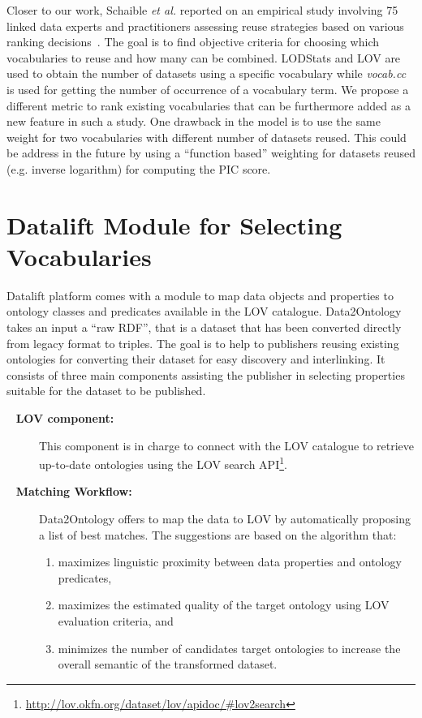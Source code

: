 \begin{description}
Closer to our work, Schaible \emph{et al.} reported on an empirical study involving 75 linked data experts and practitioners assessing reuse strategies based on various ranking decisions~\cite{Schaible:ESWC14}. The goal is to find objective criteria for choosing which vocabularies to reuse and how many can be combined. LODStats and LOV are used to obtain the number of datasets using a specific vocabulary while \textit{vocab.cc} is used for getting the number of occurrence of a vocabulary term. We propose a different metric to rank existing vocabularies that can be furthermore added as a new feature in such a study. One drawback in the model is to use the same weight for two vocabularies with different number of datasets reused. This could be address in the future by using a ``function based'' weighting for datasets reused (e.g. inverse logarithm) for computing the PIC score.



\section{Datalift Module for Selecting Vocabularies}
\label{sec:data2rdf}
Datalift platform comes with a module to map data objects and properties to ontology classes and predicates available in the LOV catalogue. Data2Ontology takes an input a ``raw RDF'', that is a dataset that has been converted directly from legacy format to triples. The goal is to help to publishers reusing existing ontologies for converting their dataset for easy discovery and interlinking. It consists of three main components assisting the publisher in selecting properties suitable for the dataset to be published. \begin{description}
\item[\odot~ \textbf{LOV component:}] This component is in charge to connect with the LOV catalogue to retrieve up-to-date ontologies using the LOV search API\footnote{\url{http://lov.okfn.org/dataset/lov/apidoc/\#lov2search}}.
\item[\odot~ \textbf{Matching Workflow:}] Data2Ontology offers to map the data to LOV by automatically proposing a list of best matches. The suggestions are based on the algorithm that:
   \begin{enumerate}
   \item maximizes linguistic proximity between data properties and ontology predicates,
   \item maximizes the estimated quality of the target ontology using LOV evaluation criteria, and
   \item minimizes the number of candidates target ontologies to increase the overall semantic of the transformed dataset.
   \end{enumerate}


\end{description}
\end{description}
